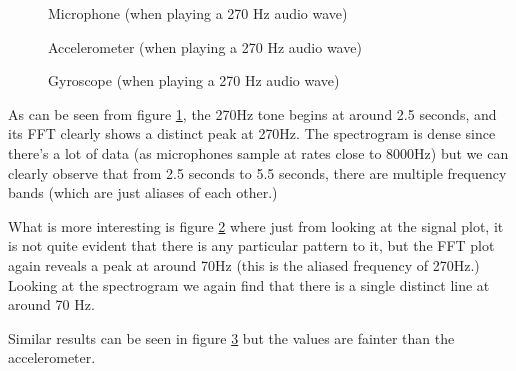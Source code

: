 
\begin{figure}[H] \begin{center}
\caption{Microphone (when playing a 270 Hz audio wave)}
\label{fig:analysis_mic}
\end{center} \end{figure}

\begin{figure}[H] \begin{center}
\caption{Accelerometer (when playing a 270 Hz audio wave)}
\label{fig:analysis_acc}
\end{center} \end{figure}

\begin{figure}[H] \begin{center}
\caption{Gyroscope (when playing a 270 Hz audio wave)}
\label{fig:analysis_gyr}
\end{center} \end{figure}

As can be seen from figure \ref{fig:analysis_mic}, the 270Hz tone begins at around 2.5 seconds, and its FFT clearly shows a distinct peak at 270Hz. The spectrogram is dense since there's a lot of data (as microphones sample at rates close to 8000Hz) but we can clearly observe that from 2.5 seconds to 5.5 seconds, there are multiple frequency bands (which are just aliases of each other.)

What is more interesting is figure \ref{fig:analysis_acc} where just from looking at the signal plot, it is not quite evident that there is any particular pattern to it, but the FFT plot again reveals a peak at around 70Hz (this is the aliased frequency of 270Hz.) Looking at the spectrogram we again find that there is a single distinct line at around 70 Hz.

Similar results can be seen in figure \ref{fig:analysis_gyr} but the values are fainter than the accelerometer.

